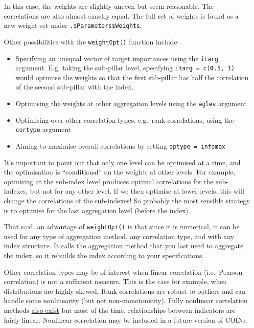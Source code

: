 \documentclass[
]{book}
\providecommand{\tightlist}{%
  \setlength{\itemsep}{0pt}\setlength{\parskip}{0pt}}
\begin{document}
In this case, the weights are slightly uneven but seem reasonable. The correlations are also almost exactly equal. The full set of weights is found as a new weight set under \texttt{.\$Parameters\$Weights}.

Other possibilities with the \texttt{weightOpt()} function include:

\begin{itemize}
\tightlist
\item
  Specifying an unequal vector of target importances using the \texttt{itarg} argument. E.g. taking the sub-pillar level, specifying \texttt{itarg\ =\ c(0.5,\ 1)} would optimise the weights so that the first sub-pillar has half the correlation of the second sub-pillar with the index.
\item
  Optimising the weights at other aggregation levels using the \texttt{aglev} argument
\item
  Optimising over other correlation types, e.g.~rank correlations, using the \texttt{cortype} argument
\item
  Aiming to maximise overall correlations by setting \texttt{optype\ =\ infomax}
\end{itemize}

It's important to point out that only one level can be optimised at a time, and the optimisation is ``conditional'' on the weights at other levels. For example, optmising at the sub-index level produces optimal correlations for the sub-indexes, but not for any other level. If we then optimise at lower levels, this will change the correlations of the sub-indexes! So probably the most sensible strategy is to optimise for the last aggregation level (before the index).

That said, an advantage of \texttt{weightOpt()} is that since it is numerical, it can be used for any type of aggregation method, any correlation type, and with any index structure. It calls the aggregation method that you last used to aggregate the index, so it rebuilds the index according to your specifications.

Other correlation types may be of interest when linear correlation (i.e.~Pearson correlation) is not a sufficient measure. This is the case for example, when distributions are highly skewed. Rank correlations are robust to outliers and can handle some nonlinearity (but not non-monotonicity). Fully nonlinear correlation methods \href{https://www.sciencedirect.com/science/article/pii/S1470160X17301759}{also exist} but most of the time, relationships between indicators are fairly linear. Nonlinear correlation may be included in a future version of COINr.
\end{document}
